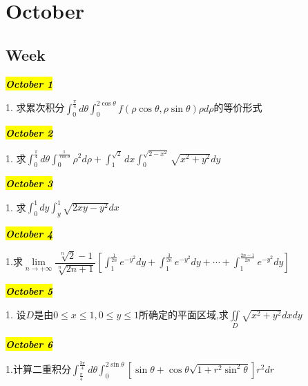 \chapter{October}
\section{Week }
\hl{\textbf{\textit{October 1}}}

1. 求累次积分$\int_{0}^{\frac{\pi}{4}}d\theta\int_{0}^{2\cos\theta}f(\rho\cos\theta,\rho\sin\theta)\rho d\rho$的等价形式
\begin{solution}
	
\end{solution}

\hl{\textbf{\textit{October 2}}}

1. 求$\int_{0}^{\frac{\pi}{4}}d\theta\int_{0}^{\frac{1}{\cos\theta}}\rho^2d\rho+\int_{1}^{\sqrt{2}}dx\int_{0}^{\sqrt{2-x^2}}\sqrt{x^2+y^2}dy$
\begin{solution}
	
\end{solution}

\hl{\textbf{\textit{October 3}}}

1. 求$\int_{0}^{1}dy\int_{y}^{1}\sqrt{2xy-y^2}dx$
\begin{solution}
	
\end{solution}

\hl{\textbf{\textit{October 4}}}

1.求$\lim\limits_{n\rightarrow +\infty}\dfrac{\sqrt[n]{2}-1}{\sqrt[n]{2n+1}}\left[\int_{1}^{\frac{1}{2n}}e^{-y^2}dy+\int_{1}^{\frac{3}{2n}}e^{-y^2}dy+\cdots+\int_{1}^{\frac{2n-1}{2n}}e^{-y^2}dy \right]$
\begin{solution}
	
\end{solution}

\hl{\textbf{\textit{October 5}}}

1. 设$D$是由$0\leq x\leq 1,0\leq y\leq 1$所确定的平面区域,求$\iint\limits_{D}\sqrt{x^2+y^2}dxdy$
\begin{solution}
	
\end{solution}

\hl{\textbf{\textit{October 6}}}

1.计算二重积分$\int_{\frac{\pi}{4}}^{\frac{3\pi}{4}}d\theta\int_{0}^{2\sin\theta}\left[ \sin\theta+\cos\theta\sqrt{1+r^2\sin^{2}\theta}\right]r^2dr $
\begin{solution}
	
\end{solution}

